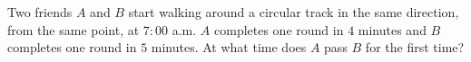 Two friends $A$ and $B$ start walking around a circular track in the same direction, from the same point, at $7{:}00$ a.m. $A$ completes one round in $4$ minutes and $B$ completes one round in $5$ minutes. At what time does $A$ pass $B$ for the first time?
